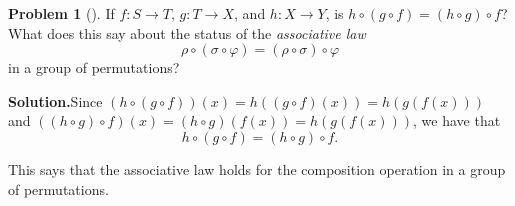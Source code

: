 \documentclass[10pt,]{book}
\theoremstyle{plain}
\theoremstyle{definition}
\newtheorem{activity}[project]{Problem}
\theoremstyle{definition}
\numberwithin{equation}{chapter}
\begin{document}
\begin{activity}[]\label{activity-252}
If \(f:S\rightarrow T\), \(g:T\rightarrow X\), and \(h:X \rightarrow Y\), is \(h\circ(g\circ f) = (h\circ g)\circ f\)? What does this say about the status of the \emph{associative law}%
\begin{equation*}
\rho\circ(\sigma\circ \varphi) = (\rho\circ \sigma)\circ\varphi
\end{equation*}
in a group of permutations?%
\par\medskip\noindent%
\textbf{Solution.}\quad Since \((h\circ(g\circ f)) (x) = h((g\circ f)(x)) = h(g(f(x)))\) and \(((h\circ
g)\circ f) (x) = (h\circ g)(f(x)) = h(g(f(x)))\), we have that%
\begin{equation*}
h\circ (g\circ f) =
(h\circ g)\circ f.
\end{equation*}
%
\par
This says that the associative law holds for the composition operation in a group of permutations.%
\end{activity}
\end{document}
